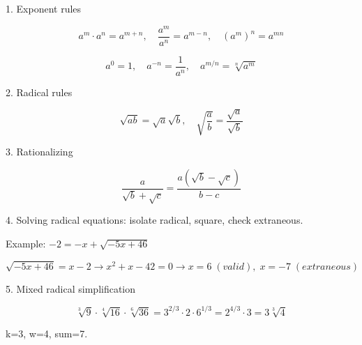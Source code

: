 1. Exponent rules

$$ a^m \cdot a^n = a^{m+n}, \quad \frac{a^m}{a^n} = a^{m-n}, \quad (a^m)^n = a^{mn} $$

$$ a^0=1, \quad a^{-n}=\frac{1}{a^n}, \quad a^{m/n}=\sqrt[n]{a^m} $$

2. Radical rules

$$ \sqrt{ab}=\sqrt{a}\sqrt{b}, \quad \sqrt{\frac{a}{b}}=\frac{\sqrt{a}}{\sqrt{b}} $$

3. Rationalizing

$$ \frac{a}{\sqrt{b}+\sqrt{c}} = \frac{a(\sqrt{b}-\sqrt{c})}{b-c} $$

4. Solving radical equations: isolate radical, square, check extraneous.

Example: $-2 = -x + \sqrt{-5x + 46}$

$$ \sqrt{-5x+46} = x-2 \rightarrow x^2+x-42=0 \rightarrow x=6 \; (valid), \; x=-7 \; (extraneous) $$

5. Mixed radical simplification

$$ \sqrt[3]{9} \cdot \sqrt[4]{16} \cdot \sqrt[6]{36} = 3^{2/3} \cdot 2 \cdot 6^{1/3} = 2^{4/3} \cdot 3 = 3\sqrt[3]{4} $$

k=3, w=4, sum=7.

